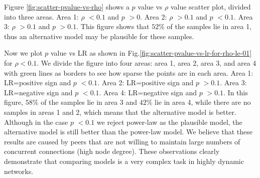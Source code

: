 Figure \ref{fig:scatter-pvalue-vs-rho} shows a $p$ value vs $\rho$ value scatter plot, divided into three areas.
Area 1: $\rho$ $<0.1$ and $p$ $>0$. 
Area 2: $\rho$ $>0.1$ and $p$ $<0.1$.
Area 3: $\rho$ $>0.1$ and $p$ $>0.1$. 
This figure shows that $52\%$ of the samples lie in area 1, thus an alternative model may be plausible for these samples.

Now we plot $p$ value vs LR as shown in Fig.\ref{fig:scatter-pvalue-vs-lr-for-rho-le-01} for $\rho < 0.1$.
We divide the figure into four areas: area 1, area 2, area 3, and area 4  with green lines as borders to see how sparse the points are in each area.
Area 1: LR=positive sign and $p$ $<0.1$.
Area 2: LR=positive sign and $p$ $>0.1$.
Area 3: LR=negative sign and $p$ $<0.1$.
Area 4: LR=negative sign and $p$ $>0.1$. 
In this figure, $58\%$ of the samples lie in area 3 and  $42\%$ lie in area 4, while there are no samples in areas 1 and 2, which means that the alternative model is better.
Although in the case $p$ $<0.1$ we reject power-law as the plausible model, the alternative model is still better than the power-law model. 
We believe that these results are caused by peers that are not willing to maintain large numbers of concurrent connections (high node degree).
These observations clearly demonstrate that comparing models is a very complex task in highly dynamic networks.



